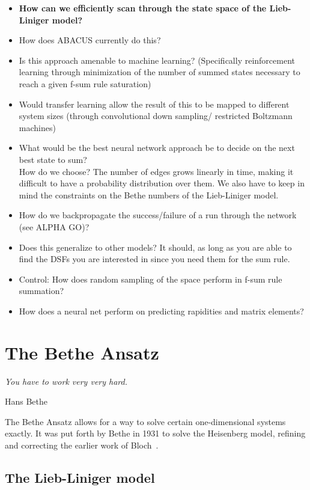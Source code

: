 \documentclass[11pt, a4paper]{report} %
\begin{document}
\begin{itemize}
  \item \textbf{How can we efficiently scan through the state space of the Lieb-Liniger model?}
  \item How does ABACUS currently do this?
  \item Is this approach amenable to machine learning? (Specifically reinforcement learning through minimization of the number of summed states necessary to reach a given f-sum rule saturation)
  \item Would transfer learning allow the result of this to be mapped to different system sizes (through convolutional down sampling/ restricted Boltzmann machines)
  \item What would be the best neural network approach be to decide on the next best state to sum? \\ How do we choose? The number of edges grows linearly in time, making it difficult to have a probability distribution over them. We also have to keep in mind the constraints on the Bethe numbers of the Lieb-Liniger model.    
  \item How do we backpropagate the success/failure of a run through the network (see ALPHA GO)?
  \item Does this generalize to other models? It should, as long as you are able to find the DSFs you are interested in since you need them for the sum rule.
  \item Control: How does random sampling of the space perform in f-sum rule summation?
  \item How does a neural net perform on predicting rapidities and matrix elements?
\end{itemize}

\chapter{The Bethe Ansatz}\label{chap:bethe_ansatz}

\epigraph{\textit{You have to work very very hard.}}{Hans Bethe}

The Bethe Ansatz allows for a way to solve certain one-dimensional systems exactly.
It was put forth by Bethe in 1931 to solve the Heisenberg model, refining and correcting the earlier work of Bloch~\cite{Bethe1931}.

\section{The Lieb-Liniger model}
\end{document}

